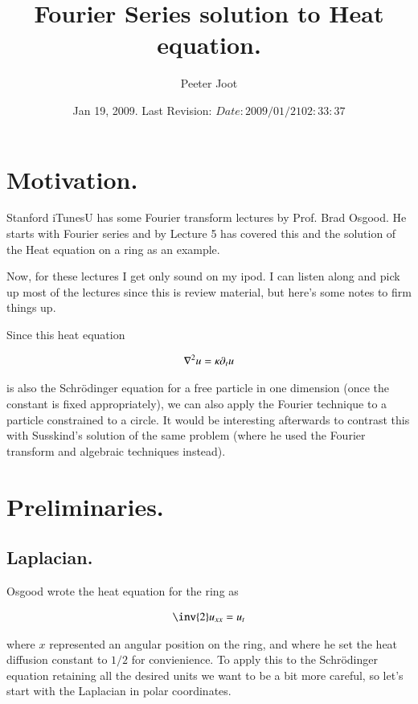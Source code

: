 \documentclass{article}
\title{ Fourier Series solution to Heat equation. }
\author{Peeter Joot}
\date{ Jan 19, 2009.  Last Revision: $Date: 2009/01/21 02:33:37 $ }
\begin{document}
\maketitle{}


\section{ Motivation. }

Stanford iTunesU has some Fourier transform lectures by Prof. Brad Osgood.
He starts with Fourier series and by Lecture 5 has covered this and
the solution of the Heat equation on a ring as an example.

Now, for these lectures I get only sound on my ipod.  I can listen along and
pick up most of the lectures since this is review material, but here's some
notes to firm things up.

Since this heat equation

\begin{align}
\nabla^2 u = \kappa \partial_t u
\end{align}

is also the Schr\"{o}dinger equation for a free particle in one 
dimension (once the 
constant is fixed appropriately), we can also apply the Fourier
technique to a particle
constrained to a circle.  It would be interesting afterwards to 
contrast this with Susskind's solution of the
same problem (where he used the Fourier transform and algebraic techniques
instead).

\section{ Preliminaries. }

\subsection{ Laplacian. }

Osgood wrote the heat equation for the ring as

\begin{align*}
\inv{2} u_{xx} = u_t
\end{align*}

where $x$ represented an angular position on the ring, and where
he set the heat diffusion constant to $1/2$ for convienience.
To apply this to the Schr\"{o}dinger equation retaining all the desired
units we want to be a bit more careful, so let's start with the Laplacian
in polar coordinates.
\end{document}
